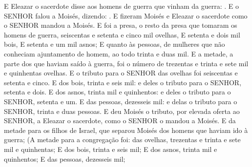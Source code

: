 {  E Eleazar o sacerdote disse aos homens de guerra que vinham da guerra: .
  E o SENHOR falou a Moisés, dizendo:
  .
  E fizeram Moisés e Eleazar o sacerdote como o SENHOR mandou a Moisés.
  E foi a presa, o resto da presa que tomaram os homens de guerra, seiscentas e setenta e cinco mil ovelhas,
  E setenta e dois mil bois,
  E setenta e um mil asnos;
  E quanto às pessoas, de mulheres que não conheciam ajuntamento de homem, ao todo trinta e duas mil.
  E a metade, a parte dos que haviam saído à guerra, foi o número de trezentas e trinta e sete mil e quinhentas ovelhas. %
  E o tributo para o SENHOR das ovelhas foi seiscentas e setenta e cinco.
  E dos bois, trinta e seis mil: e deles o tributo para o SENHOR, setenta e dois.
  E dos asnos, trinta mil e quinhentos: e deles o tributo para o SENHOR, setenta e um.
  E das pessoas, dezesseis mil: e delas o tributo para o SENHOR, trinta e duas pessoas.
  E deu Moisés o tributo, por elevada oferta ao SENHOR, a Eleazar o sacerdote, como o SENHOR o mandou a Moisés.
  E da metade para os filhos de Israel, que separou Moisés dos homens que haviam ido à guerra;
  (A metade para a congregação foi: das ovelhas, trezentas e trinta e sete mil e quinhentas;
  E dos bois, trinta e seis mil;
  E dos asnos, trinta mil e quinhentos;
  E das pessoas, dezesseis mil;
}
